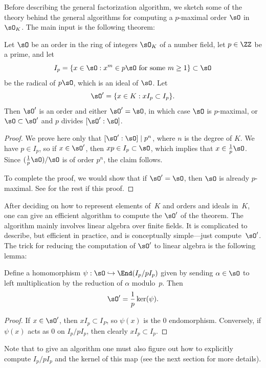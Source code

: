 Before describing the general factorization algorithm, we sketch some
of the theory behind the general algorithms for computing a
$p$-maximal order $\sO$ in $\sO_K$.  The main input is the following theorem:
\begin{theorem}
  Let $\sO$ be an order in the ring of integers $\sO_K$ of a number field,
  let $p\in\ZZ$ be a prime, and let
  $$
    I_p = \{x \in \sO : x^m \in p\sO \text{ for some $m\geq 1$}\} \subset \sO
  $$
  be the radical of $p\sO$, which is an ideal of $\sO$. Let
  $$
    \sO' = \{x \in K : xI_p \subset I_p\}.
  $$
  Then $\sO'$ is an order and either $\sO'=\sO$, in which case $\sO$ is
  $p$-maximal, or $\sO\subset\sO'$ and $p$ divides $[\sO':\sO]$.
\end{theorem}
\begin{proof}
  We prove here only that $[\sO':\sO] \mid p^n$, where $n$ is the degree
  of $K$.  We have $p\in I_p$, so if $x \in \sO'$, then $xp \in
  I_p\subset \sO$, which implies that $x\in \frac{1}{p}\sO$.  Since
  $(\frac{1}{p}\sO)/\sO$ is of order $p^n$, the claim follows.

  To complete the proof, we would show that if $\sO' = \sO$, then $\sO$ is
  already $p$-maximal.  See \cite[\S6.1.1]{cohen:course_ant} for the
  rest if this proof.
\end{proof}

After deciding on how to represent elements of~$K$ and orders and
ideals in~$K$, one can give an efficient algorithm to compute the
$\sO'$ of the theorem.  The algorithm mainly involves linear algebra
over finite fields.  It is complicated to describe, but efficient in
practice, and is conceptually simple---just compute~$\sO'$.  The trick
for reducing the computation of $\sO'$ to linear algebra is the
following lemma:
\begin{lemma}
  Define a homomorphism $\psi:\sO \hookrightarrow \End(I_p/ p I_p)$ given by
  sending $\alpha\in\sO$ to left multiplication by the reduction of
  $\alpha$ modulo~$p$.  Then
  $$
    \sO'=\frac{1}{p} \ker(\psi).
  $$
\end{lemma}
\begin{proof}
  If $x \in \sO'$, then $x I_p \subset I_P$, so $\psi(x)$ is the $0$
  endomorphism.  Conversely, if $\psi(x)$ acts as $0$ on $I_p/ p I_p$,
  then clearly $x I_p \subset I_p$.
\end{proof}

Note that to give an algorithm one must also figure out how to
explicitly compute $I_p/ p I_p$ and the kernel of this map
(see  the next section for more
details).


